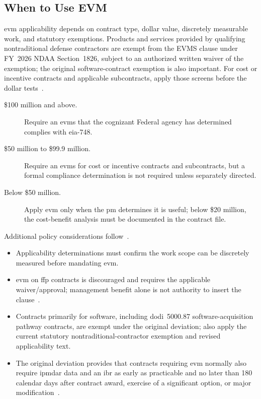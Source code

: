 \documentclass[../main.tex]{subfiles}
\begin{document}
\subsection{When to Use EVM}
\ac{evm} applicability depends on contract type, dollar value, discretely measurable work, and statutory exemptions. Products and services provided by qualifying nontraditional defense contractors are exempt from the EVMS clause under FY~2026 NDAA Section~1826, subject to an authorized written waiver of the exemption; the original software-contract exemption is also important. For cost or incentive contracts and applicable subcontracts, apply those screens before the dollar tests~\autocite{USC-10-3014,DFARS-EVMS-Deviation-2026,DPCAP-RFO-Index-20261020}.

\begin{description}
  \item[\$100 million and above.] Require an \ac{evms} that the cognizant Federal agency has determined complies with
        \ac{eia}-748.
  \item[\$50 million to \$99.9 million.] Require an \ac{evms} for cost or incentive contracts and subcontracts, but a
        formal compliance determination is not required unless separately directed.
  \item[Below \$50 million.] Apply \ac{evm} only when the \ac{pm} determines it is useful; below \$20 million, the
        cost-benefit analysis must be documented in the contract file.
\end{description}
Additional policy considerations follow~\autocite{DFARS-EVMS-Deviation-2026-Baseline,DFARS-EVMS-Deviation-2026,USC-10-3014}.
\begin{itemize}
  \item Applicability determinations must confirm the work scope can be discretely measured before mandating \ac{evm}.
  \item \ac{evm} on \ac{ffp} contracts is discouraged and requires the applicable waiver/approval; management benefit alone is not authority to insert the clause~\autocite{DFARS-EVMS-Deviation-2026-Baseline}.
  \item Contracts primarily for software, including \ac{dodi}~5000.87 software-acquisition pathway contracts, are exempt under the original deviation; also apply the current statutory nontraditional-contractor exemption and revised applicability text.
  \item The original deviation provides that contracts requiring \ac{evm} normally also require \ac{ipmdar} data and an \ac{ibr} as early as practicable
        and no later than 180 calendar days after contract award, exercise of a significant option, or major modification~\autocite{DFARS-EVMS-Deviation-2026-Baseline,DFARS-EVMS-Deviation-2026}.
\end{itemize}
\end{document}
